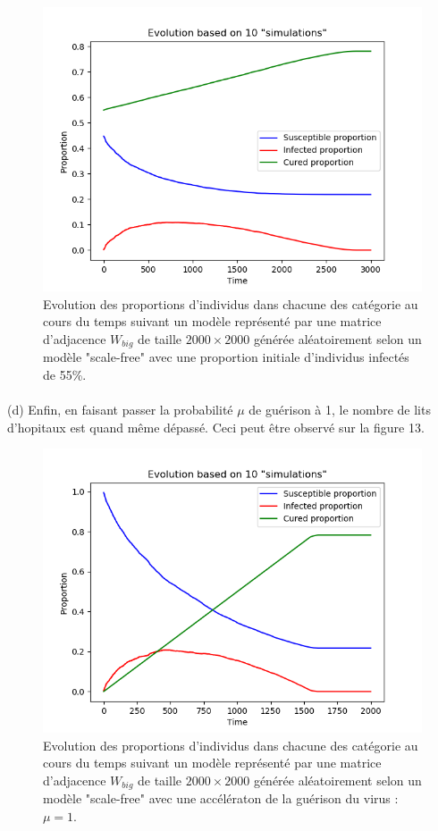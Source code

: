 \documentclass[a4paper, 12pt, oneside]{article}
\begin{document}
\begin{figure}[H]
	\centering
	\includegraphics[scale=1]{Wbig_dense_initial_immunised_comparaison.png} 
	\caption{Evolution des proportions d'individus dans chacune des catégorie au cours du temps suivant un modèle représenté par une matrice d'adjacence $W_{big}$ de taille $2000 \times 2000$ générée aléatoirement selon un modèle "scale-free" avec une proportion initiale d'individus infectés de 55\%.}
\end{figure}

\paragraph{}(d) Enfin, en faisant passer la probabilité $\mu$ de guérison à 1, le nombre de lits d'hopitaux est quand même dépassé. Ceci peut être observé sur la figure 13.

\begin{figure}[H]
	\centering
	\includegraphics[scale=1]{Wbig_dense_speeded_heal_comparaison.png} 
	\caption{Evolution des proportions d'individus dans chacune des catégorie au cours du temps suivant un modèle représenté par une matrice d'adjacence $W_{big}$ de taille $2000 \times 2000$ générée aléatoirement selon un modèle "scale-free" avec une accélératon de la guérison du virus : $\mu = 1$.}
\end{figure}
\end{document}
